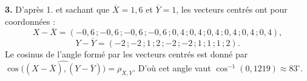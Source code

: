 \documentclass[11pt]{article}
\begin{document}
\textbf{3.} D'après 1. et sachant que $\overline{X} = 1{,}6$ et $\overline{Y} = 1$, les vecteurs centrés ont pour coordonnées :
\[ X - \overline{X} = (-0{,}6\,;-0{,}6\,;-0{,}6\,;-0{,}6\,;0{,}4\,;0{,}4\,;0{,}4\,;0{,}4\,;0{,}4\,;0{,}4), \]
\[ Y - \overline{Y} = (-2\,;-2\,;1\,;2\,;-2\,;-2\,;1\,;1\,;1\,;2). \]
Le cosinus de l'angle formé par les vecteurs centrés est donné par $\cos\big(\widehat{(X - \overline{X}),(Y - \overline{Y})}\big) = \rho_{X,Y}$. D'où cet angle vaut $\cos^{-1}(0{,}1219) \approx 83^\circ$.
\end{document}
